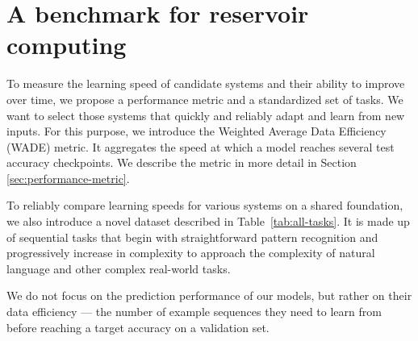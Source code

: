 \section{A benchmark for reservoir computing\label{sec:tasks}}
To measure the learning speed of candidate systems and their ability to improve
over time, we propose a performance metric and a standardized set of tasks. We
want to select those systems that quickly and reliably adapt and learn from new inputs.
For this purpose, we introduce the Weighted Average Data Efficiency (WADE)
metric. It aggregates the speed at which a model reaches several test accuracy
checkpoints. We describe the metric in more detail in Section
\ref{sec:performance-metric}.

To reliably compare learning speeds for various systems on a shared foundation,
we also introduce a novel dataset described in Table~\ref{tab:all-tasks}. It is
made up of sequential tasks that begin with straightforward pattern recognition
and progressively increase in complexity to approach the complexity of natural
language and other complex real-world tasks.

We do not focus on the prediction performance of our models, but rather on their
data efficiency --- the number of example sequences they need to learn from before
reaching a target accuracy on a validation set.

